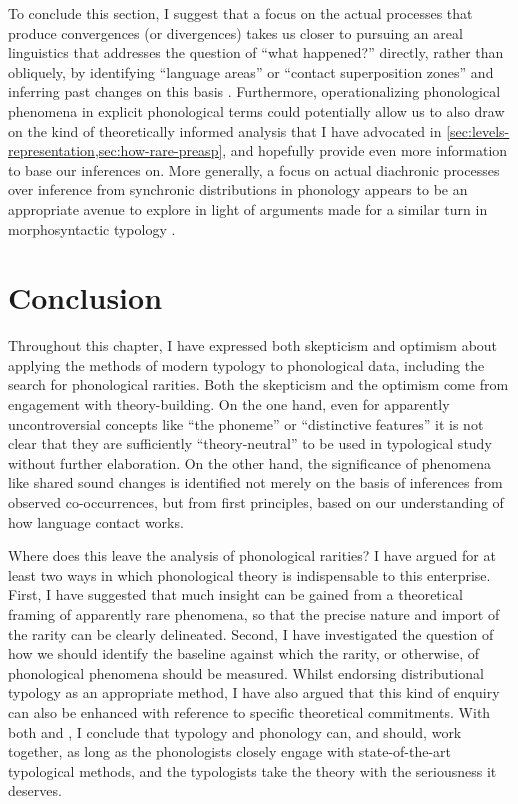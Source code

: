\documentclass[output=paper,colorlinks,citecolor=brown]{langscibook}
\begin{document}
To conclude this section, I suggest that a focus on the actual processes that produce convergences (or divergences) takes us closer to pursuing an areal linguistics that addresses the question of \enquote{what happened?} directly, rather than obliquely, by identifying \enquote{language areas} or \enquote{contact superposition zones} \parencite[on this notion, see][]{koptjevskaja-tamm2001circum} and inferring past changes on this basis \parencite{campbell2006areal}. Furthermore, operationalizing phonological phenomena in explicit phonological terms could potentially allow us to also draw on the kind of theoretically informed analysis that I have advocated in \cref{sec:levels-representation,sec:how-rare-preasp}, and hopefully provide even more information to base our inferences on. More generally, a focus on actual diachronic processes over inference from synchronic distributions in phonology appears to be an appropriate avenue to explore in light of arguments made for a similar turn in morphosyntactic typology \parencite[e.g.][]{Maslova2000,bickel2013distributional,cristofaro2019taking}.

\section{Conclusion}\label{conclusion}

Throughout this chapter, I have expressed both skepticism and optimism about applying the methods of modern typology to phonological data, including the search for phonological rarities. Both the skepticism and the optimism come from engagement with theory\hyp building. On the one hand, even for apparently uncontroversial concepts like \enquote{the phoneme} or \enquote{distinctive features} it is not clear that they are sufficiently \enquote{theory-neutral} to be used in typological study without further elaboration. On the other hand, the significance of phenomena like shared sound changes is identified not merely on the basis of inferences from observed co-occurrences, but from first principles, based on our understanding of how language contact works. 

Where does this leave the analysis of phonological rarities? I have argued for at least two ways in which phonological theory is indispensable to this enterprise. First, I have suggested that much insight can be gained from a theoretical framing of apparently rare phenomena, so that the precise nature and import of the rarity can be clearly delineated. Second, I have investigated the question of how we should identify the baseline against which the rarity, or otherwise, of phonological phenomena should be measured. Whilst endorsing distributional typology as an appropriate method, I have also argued that this kind of enquiry can also be enhanced with reference to specific theoretical commitments. With both \textcite{hyman08:_univer} and \textcite{plank2018}, I conclude that typology and phonology can, and should, work together, as long as the phonologists closely engage with state-of-the-art typological methods, and the typologists take the theory with the seriousness it deserves.
\end{document}
